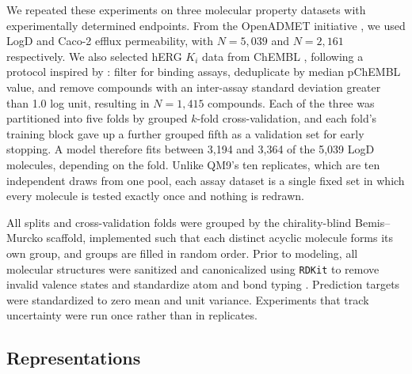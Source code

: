 We repeated these experiments on three molecular property datasets with experimentally determined endpoints. From the OpenADMET initiative \citep{openadmet}, we used LogD and Caco-2 efflux permeability, with $N = 5{,}039$ and $N = 2{,}161$ respectively. We also selected hERG $K_i$ data from ChEMBL \citep{Zdrazil2023}, following a protocol inspired by \citet{landrum2024}: filter for binding assays, deduplicate by median pChEMBL value, and remove compounds with an inter-assay standard deviation greater than 1.0 log unit, resulting in $N = 1{,}415$ compounds. Each of the three was partitioned into five folds by grouped $k$-fold cross-validation, and each fold's training block gave up a further grouped fifth as a validation set for early stopping. A model therefore fits between 3,194 and 3,364 of the 5,039 LogD molecules, depending on the fold. Unlike QM9's ten replicates, which are ten independent draws from one pool, each assay dataset is a single fixed set in which every molecule is tested exactly once and nothing is redrawn.

All splits and cross-validation folds were grouped by the chirality-blind Bemis--Murcko scaffold, implemented such that each distinct acyclic molecule forms its own group, and groups are filled in random order. Prior to modeling, all molecular structures were sanitized and canonicalized using \texttt{RDKit} to remove invalid valence states and standardize atom and bond typing \citep{rdkit}. Prediction targets were standardized to zero mean and unit variance. Experiments that track uncertainty were run once rather than in replicates.

\subsection{Representations}

